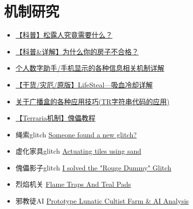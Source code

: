 \section{机制研究}
\begin{itemize}
\item \href{https://www.bbstr.net/threads/469/}{【科普】松露人究竟需要什么？}
\item \href{https://www.bbstr.net/threads/463/}{【科普\&详解】为什么你的房子不合格？} 
\item \href{https://www.bbstr.net/threads/133/}{个人数字助手/手机显示的各种信息相关机制详解}
\item \href{https://www.bbstr.net/threads/lifesteal.198/}{【干货/灾厄/原版】LifeSteal—吸血冷却详解}
\item \href{https://www.bbstr.net/threads/tr.127/}{关于广播盒的各种应用技巧(TR字符串代码的应用)}
\item \href{https://www.bilibili.com/read/cv2156999}{【Terraria机制】傀儡教程}
\item 绳索glitch \href{https://forums.terraria.org/index.php?threads/someone-found-a-new-glitch.75822/}{Someone found a new glitch?}
\item 虚化家具glitch \href{https://forums.terraria.org/index.php?threads/actuating-tiles-using-sand.75811/}{Actuating tiles using sand}
\item 傀儡影子glitch \href{https://forums.terraria.org/index.php?threads/i-solved-the-rouge-dummy-glitch.76951/}{I solved the "Rouge Dummy" Glitch}
\item 烈焰机关 \href{https://forums.terraria.org/index.php?threads/flame-traps-and-teal-pads.76835/}{Flame Traps And Teal Pads}
\item 邪教徒AI \href{https://forums.terraria.org/index.php?threads/prototype-lunatic-cultist-farm-ai-analysis.77022/}{Prototype Lunatic Cultist Farm \& AI Analysis}
\end{itemize}

